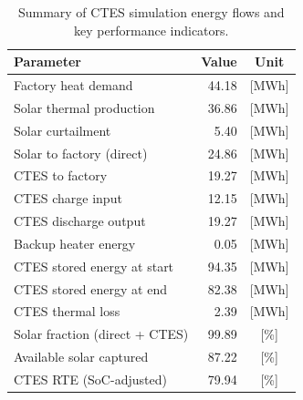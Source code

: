 \renewcommand{\arraystretch}{1.2}
\begin{table}[h]
\centering
\begin{tabular}{l|r c}
\hline
Parameter & Value & Unit \\
\hline
Factory heat demand & 44.18 & [MWh] \\
Solar thermal production & 36.86 & [MWh] \\
Solar curtailment & 5.40 & [MWh] \\
Solar to factory (direct) & 24.86 & [MWh] \\
CTES to factory & 19.27 & [MWh] \\
CTES charge input & 12.15 & [MWh] \\
CTES discharge output & 19.27 & [MWh] \\
Backup heater energy & 0.05 & [MWh] \\
CTES stored energy at start & 94.35 & [MWh] \\
CTES stored energy at end & 82.38 & [MWh] \\
CTES thermal loss & 2.39 & [MWh] \\
\hline
Solar fraction (direct + CTES) & 99.89 & [\%] \\
Available solar captured & 87.22 & [\%] \\
CTES RTE (SoC-adjusted) & 79.94 & [\%] \\
\hline
\end{tabular}
\caption{Summary of CTES simulation energy flows and key performance indicators.}
\label{tab:ctes-simulation-summary}
\end{table}
